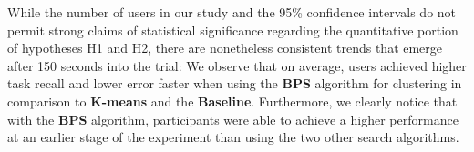 While the %
number of users in our study and the 95\% confidence intervals 
do not permit strong claims of statistical significance regarding the quantitative portion of hypotheses H1 and H2, there are nonetheless consistent trends that emerge after 150 seconds into the trial:
We observe that on average, users achieved higher task recall and lower error faster when using the {\bf BPS} algorithm for clustering in comparison to {\bf $\mathbf{K}$-means} and the {\bf Baseline}.
Furthermore, we clearly notice that with the {\bf BPS} algorithm, participants were able to achieve a higher performance at an earlier stage of the experiment than using the two other search algorithms. 





